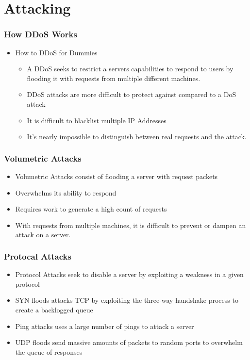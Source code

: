 \documentclass{beamer}
\begin{document}
\section{Attacking}

\begin{frame}
    \frametitle{How DDoS Works}
    \begin{itemize}
        \item How to DDoS for Dummies
            \begin{itemize}
                \item A DDoS seeks to restrict a servers capabilities to respond to users by flooding it with requests from multiple different machines.
                \item DDoS attacks are more difficult to protect against compared to a DoS attack
                \item It is difficult to blacklist multiple IP Addresses
                \item It's nearly impossible to distinguish between real requests and the attack.
            \end{itemize}
    \end{itemize}
\end{frame}

\begin{frame}
    \frametitle{Volumetric Attacks}
        \begin{itemize}
            \item Volumetric Attacks consist of flooding a server with request packets
            \item Overwhelms its ability to respond
            \item Requires work to generate a high count of requests
            \item With requests from multiple machines, it is difficult to prevent or dampen an attack on a server.
    \end{itemize}
\end{frame}
\begin{frame}
    \frametitle{Protocal Attacks}
     \begin{itemize}
            \item Protocol Attacks seek to disable a server by exploiting a weakness in a given protocol
            \item SYN floods attacks TCP by exploiting the three-way handshake process to create a backlogged queue
            \item Ping attacks uses a large number of pings to attack a server
            \item UDP floods send massive amounts of packets to random ports to overwhelm the queue of responses
        \end{itemize}
\end{frame}
\end{document}
